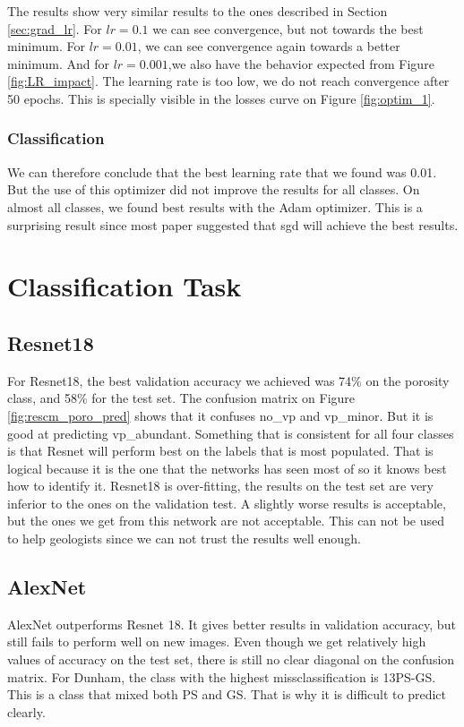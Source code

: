 The results show very similar results to the ones described in Section \ref{sec:grad_lr}. For \(lr=0.1\) we can see convergence, but not towards the best minimum. For \(lr=0.01\), we can see convergence again towards a better minimum. And for \(lr=0.001\),we also have the behavior expected from Figure \ref{fig:LR_impact}. The learning rate is too low, we do not reach convergence after 50 epochs. This is specially visible in the losses curve on Figure \ref{fig:optim_1}. 

\subsubsection{Classification}
We can therefore conclude that the best learning rate that we found was 0.01.
But the use of this optimizer did not improve the results for all classes. On almost all classes, we found best results with the Adam optimizer. This is a surprising result since most paper suggested that \gls{sgd} will achieve the best results. 

\section{Classification Task}
\subsection{Resnet18}
For Resnet18, the best validation accuracy we achieved was 74\% on the porosity class, and 58\% for the test set. The confusion matrix on Figure \ref{fig:rescm_poro_pred} shows that it confuses no\_vp and vp\_minor. But it is good at predicting vp\_abundant. Something that is consistent for all four classes is that Resnet will perform best on the labels that is most populated. That is logical because it is the one that the networks has seen most of so it knows best how to identify it. Resnet18 is over-fitting, the results on the test set are very inferior to the ones on the validation test. A slightly worse results is acceptable, but the ones we get from this network are not acceptable. This can not be used to help geologists since we can not trust the results well enough.

\subsection{AlexNet}
AlexNet outperforms Resnet 18. It gives better results in validation accuracy, but still fails to perform well on new images. Even though we get relatively high values of accuracy on the test set, there is still no clear diagonal on the confusion matrix. For Dunham, the class with the highest missclassification is 13PS-GS. This is a class that mixed both PS and GS. That is why it is difficult to predict clearly. 

